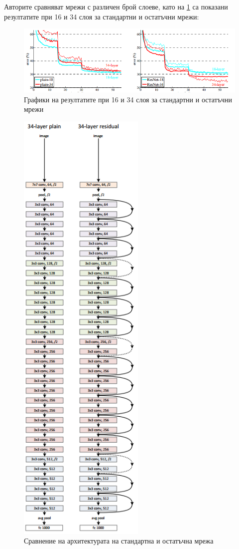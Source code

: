 Авторите сравняват мрежи с различен брой слоеве, като на \ref{fig:plain_residual_charts} са показани резултатите при 16 и 34 слоя за стандартни и остатъчни мрежи:

\begin{figure}[H]
\centering
\includegraphics[width=400pt]{Figures/plain_residual_charts.PNG}
\caption{Графики на резултатите при 16 и 34 слоя за стандартни и остатъчни мрежи \cite{He2015} }
\label{fig:plain_residual_charts}
\end{figure}

\begin{figure}[H]
\centering
\includegraphics[height=620pt]{Figures/plain_residual.PNG}
\caption{Сравнение на архитектурата на стандартна и остатъчна мрежа \cite{He2015} }
\label{fig:plain_residual}
\end{figure}

